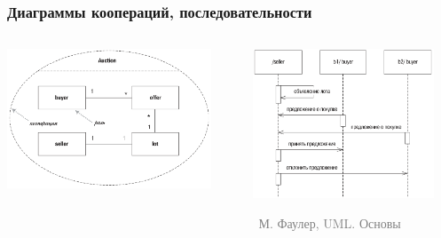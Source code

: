 \documentclass[xetex,mathserif,serif]{beamer}
\newcommand{\attribution}[1] {
	\vspace{-5mm}\begin{flushright}\begin{scriptsize}\textcolor{gray}{\textcopyright\, #1}\end{scriptsize}\end{flushright}
}
\begin{document}
	\begin{frame}
		\frametitle{Диаграммы коопераций, последовательности}
		\begin{columns}
			\begin{column}{0.5\textwidth}
				\begin{center}
					\includegraphics[width=0.9\textwidth]{cooperationDiagram.png}
				\end{center}
			\end{column}
			\begin{column}{0.5\textwidth}
				\begin{center}
					\includegraphics[width=0.9\textwidth]{cooperationSequenceDiagram.png}
					\attribution{М. Фаулер, UML. Основы}
				\end{center}
			\end{column}
		\end{columns}
	\end{frame}
\end{document}
